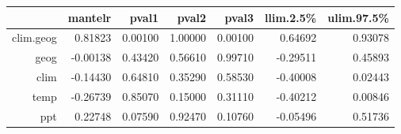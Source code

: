 \begin{table}[ht]
\centering
\begin{tabular}{rrrrrrr}
  \hline
 & mantelr & pval1 & pval2 & pval3 & llim.2.5\% & ulim.97.5\% \\ 
  \hline
clim.geog & 0.81823 & 0.00100 & 1.00000 & 0.00100 & 0.64692 & 0.93078 \\ 
  geog & -0.00138 & 0.43420 & 0.56610 & 0.99710 & -0.29511 & 0.45893 \\ 
  clim & -0.14430 & 0.64810 & 0.35290 & 0.58530 & -0.40008 & 0.02443 \\ 
  temp & -0.26739 & 0.85070 & 0.15000 & 0.31110 & -0.40212 & 0.00846 \\ 
  ppt & 0.22748 & 0.07590 & 0.92470 & 0.10760 & -0.05496 & 0.51736 \\ 
   \hline
\end{tabular}
\end{table}

